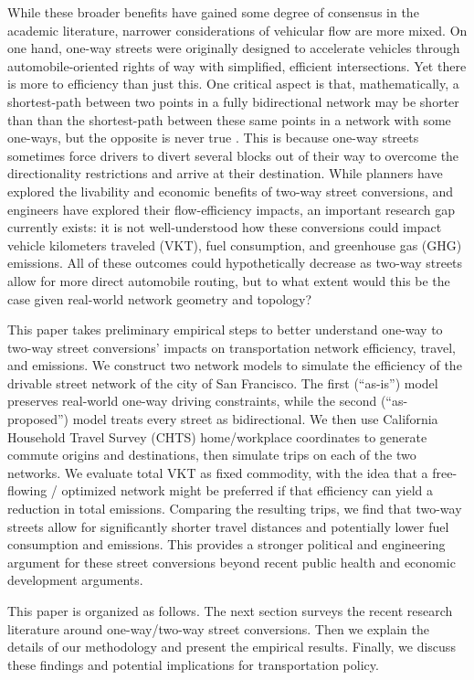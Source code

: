 \documentclass{article}
\begin{document}
While these broader benefits have gained some degree of consensus in the academic literature, narrower considerations of vehicular flow are more mixed. On one hand, one-way streets were originally designed to accelerate vehicles through automobile-oriented rights of way with simplified, efficient intersections. Yet there is more to efficiency than just this. One critical aspect is that, mathematically, a shortest-path between two points in a fully bidirectional network may be shorter than than the shortest-path between these same points in a network with some one-ways, but the opposite is never true \citep{ortigosa_analysis_2019}. This is because one-way streets sometimes force drivers to divert several blocks out of their way to overcome the directionality restrictions and arrive at their destination. While planners have explored the livability and economic benefits of two-way street conversions, and engineers have explored their flow-efficiency impacts, an important research gap currently exists: it is not well-understood how these conversions could impact vehicle kilometers traveled (VKT), fuel consumption, and greenhouse gas (GHG) emissions. All of these outcomes could hypothetically decrease as two-way streets allow for more direct automobile routing, but to what extent would this be the case given real-world network geometry and topology?

This paper takes preliminary empirical steps to better understand one-way to two-way street conversions' impacts on transportation network efficiency, travel, and emissions. We construct two network models to simulate the efficiency of the drivable street network of the city of San Francisco. The first (\enquote{as-is}) model preserves real-world one-way driving constraints, while the second (\enquote{as-proposed}) model treats every street as bidirectional. We then use California Household Travel Survey (CHTS) home/workplace coordinates to generate commute origins and destinations, then simulate trips on each of the two networks. We evaluate total VKT as fixed commodity, with the idea that a free-flowing / optimized network might be preferred if that efficiency can yield a reduction in total emissions. Comparing the resulting trips, we find that two-way streets allow for significantly shorter travel distances and potentially lower fuel consumption and emissions. This provides a stronger political and engineering argument for these street conversions beyond recent public health and economic development arguments.

This paper is organized as follows. The next section surveys the recent research literature around one-way/two-way street conversions. Then we explain the details of our methodology and present the empirical results. Finally, we discuss these findings and potential implications for transportation policy.
\end{document}
